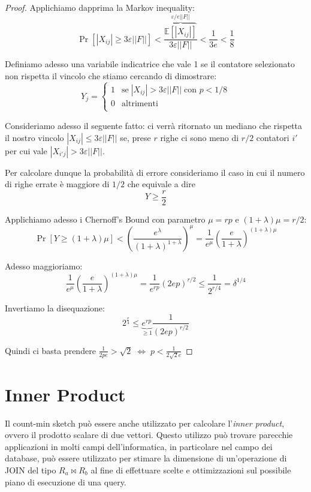 \documentclass[a4paper,11pt]{book}
\begin{document}
\begin{proof}
Applichiamo dapprima la Markov inequality:
$$ \Pr[|X_{ij}| \geq 3 \varepsilon ||F||] < \frac{\overbrace{\mathbb{E}[|X_{ij}|]}^{\varepsilon / e||F||}}{3 \varepsilon ||F||} < \frac{1}{3e} < \frac{1}{8	}$$

Definiamo adesso una variabile indicatrice che vale 1 se il contatore selezionato non rispetta il vincolo che stiamo cercando di dimostrare:
$$ Y_j = \begin{cases} 1 & \mbox{se} \; |X_{ij}| > 3\varepsilon ||F|| \; \mbox{con } p < 1/8 \\
0 & \mbox{altrimenti}\\ \end{cases}$$

Consideriamo adesso il seguente fatto: ci verr\`a ritornato un mediano che rispetta il nostro vincolo $ |X_{ij}| \leq 3 \varepsilon ||F||$ se, prese $r$ righe ci sono meno di $r/2$ contatori $i'$ per cui vale $ |X_{i'j}| > 3 \varepsilon ||F||$.

Per calcolare dunque la probabilit\`a di errore consideriamo il caso in cui il numero di righe errate \`e maggiore di $1/2$ che equivale a dire $$Y \geq \frac{r}{2}$$

Applichiamo adesso i Chernoff's Bound con parametro $\mu = rp$ e $(1 + \lambda)\mu = r/2$:
$$\Pr[Y \geq (1 + \lambda)\mu] < \left( \frac{e^{\lambda}}{(1+\lambda)^{1+\lambda}}\right)^{\mu} =   \frac{1}{e^{\mu}}\left( \frac{e}{1+\lambda}\right)^{(1+\lambda)\mu}$$

Adesso maggioriamo:
$$\frac{1}{e^{\mu}}\left( \frac{e}{1+\lambda}\right)^{(1+\lambda)\mu} = \frac{1}{e^{rp}}\left( 2ep\right)^{r/2} \leq \frac{1}{2^{r/4}} = \delta^{1/4} $$

Invertiamo la disequazione:
$$2^{\frac{r}{4}} \leq \underbrace{e^{rp}}_{\geq 1}\frac{1}{(2ep)^{r/2}} $$

Quindi ci basta prendere $\frac{1}{2pe} > \sqrt{2} \; \Leftrightarrow \; p < \frac{1}{2\sqrt{2} e}$
\end{proof}

\section{Inner Product}

Il count-min sketch pu\`o essere anche utilizzato per calcolare l'\emph{inner product}, ovvero il prodotto scalare di due vettori. Questo utilizzo pu\`o trovare parecchie applicazioni in molti campi dell'informatica, in particolare nel campo dei database, pu\`o essere utilizzato per stimare la dimensione di un'operazione di \textsf{JOIN} del tipo $R_a \bowtie R_b$ al fine di effettuare scelte e ottimizzazioni sul possibile piano di esecuzione di una query.
\end{document}
